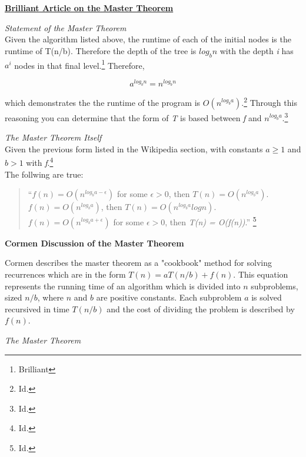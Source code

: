 \documentclass{article}
\begin{document}
\bigskip

\noindent \textbf{\href{https://brilliant.org/wiki/master-theorem/}{Brilliant Article on the Master Theorem}}

\textit{Statement of the Master Theorem} \\

Given the algorithm listed above, the runtime of each of the initial nodes is the runtime of T(n/b). Therefore the depth of the tree 
is $log_bn$ with the depth \textit{i} has \textit{$a^i$} nodes in that final level.\footnote{Brilliant} Therefore,

\[a^{log_bn} = n^{log_bn}\]

which demonstrates the the runtime of the program is \textit{$O(n^{log_ba})$}.\footnote{Id.} Through this reasoning
you can determine that the form of \textit{T} is based between \textit{f} and \textit{$n^{log_ba}$}.\footnote{Id.}

\pagebreak

\textit{The Master Theorem Itself} \\
Given the previous form listed in the Wikipedia section, with constants \textit{$a\geq1$} and \textit{$b>1$} with \textit{f}.\footnote{Id.}\\
The follwing are true: \\
\begin{quote}
``\noindent \textit{$f(n) = O(n^{log_ba-\epsilon})$} for some $\epsilon > 0$, then \textit{$T(n) = O(n^{log_ba})$}. \\
\textit{$f(n) = O(n^{log_ba})$}, then \textit{$T(n) = O(n^{log_ba}logn)$}.\\
\textit{$f(n) = O(n^{log_ba+\epsilon})$} for some $\epsilon > 0$, then \textit{T(n) = O(f(n))}.'' \footnote{Id.}
\end{quote}

\noindent \textbf{Cormen Discussion of the Master Theorem}

\smallskip

Cormen describes the master theorem as a "cookbook" method for solving recurrences which are in the form \textit{$T(n) = aT(n/b) + f(n)$}.
This equation represents the running time of an algorithm which is divided into \textit{$n$} subproblems, sized \textit{$n/b$}, where \textit{$n$} 
and \textit{$b$} are positive constants. Each subproblem \textit{$a$} is solved recursived in time \textit{$T(n/b)$} and the cost of dividing the
problem is described by \textit{$f(n)$}. 

\bigskip

\noindent\textit{The Master Theorem}
\end{document}
